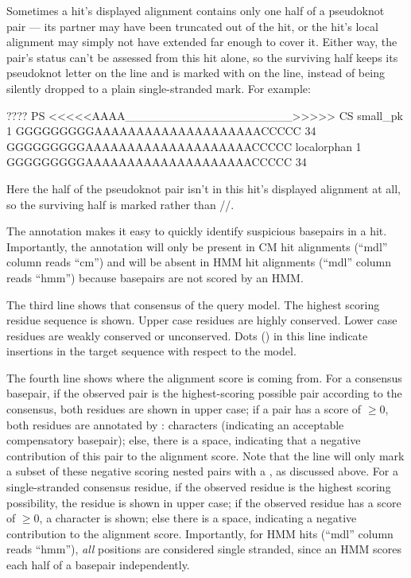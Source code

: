 Sometimes a hit's displayed alignment contains only one half of a
pseudoknot pair --- its partner may have been truncated out of the
hit, or the hit's local alignment may simply not have extended far
enough to cover it. Either way, the pair's status can't be assessed
from this hit alone, so the surviving half keeps its pseudoknot letter
on the  line and is marked with  on the 
line, instead of being silently dropped to a plain single-stranded
mark. For example:
\begin{sreoutput}
                      ????                              PS
                 <<<<<AAAA____________________>>>>> CS
     small_pk  1 GGGGGGGGGAAAAAAAAAAAAAAAAAAAACCCCC 34
                 GGGGGGGGGAAAAAAAAAAAAAAAAAAAACCCCC
  localorphan  1 GGGGGGGGGAAAAAAAAAAAAAAAAAAAACCCCC 34
\end{sreoutput}
Here the  half of the  pseudoknot pair isn't in
this hit's displayed alignment at all, so the surviving 
half is marked  rather than \otext{=}/\otext{\$}/.

The 
annotation makes it easy to quickly identify suspicious basepairs in
a hit. Importantly, the  annotation will only be present in
CM hit alignments (``mdl'' column reads ``cm'') and will be absent in
HMM hit alignments (``mdl'' column reads ``hmm'') because basepairs
are not scored by an HMM.

The third line shows that consensus of the query model. The highest
scoring residue sequence is shown. Upper case residues are highly
conserved. Lower case residues are weakly conserved or unconserved.
Dots () in this line indicate insertions in the target
sequence with respect to the model.

The fourth line shows where the alignment score is coming from. For a
consensus basepair, if the observed pair is the highest-scoring
possible pair according to the consensus, both residues are shown in
upper case; if a pair has a score of $\geq 0$, both residues are
annotated by : characters (indicating an acceptable compensatory
basepair); else, there is a space, indicating that a negative
contribution of this pair to the alignment score. Note that the
 line will only mark a subset of these negative scoring
nested pairs with a , as discussed above.
For a single-stranded consensus residue, if the observed residue is
the highest scoring possibility, the residue is shown in upper case;
if the observed residue has a score of $\geq 0$, a \otext{+} character
is shown; else there is a space, indicating a negative contribution to
the alignment score. Importantly, for HMM hits (``mdl'' column reads
``hmm''), \emph{all} positions are considered single stranded, since
an HMM scores each half of a basepair independently.

